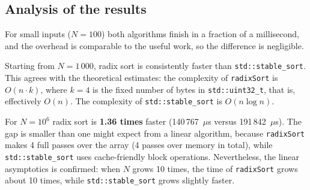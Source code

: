 \subsection{Analysis of the results}

For small inputs ($N = 100$) both algorithms finish in a fraction of a millisecond, and the
overhead is comparable to the useful work, so the difference is negligible.

Starting from $N = 1\,000$, radix sort is consistently faster than \texttt{std::stable\_sort}.
This agrees with the theoretical estimates: the complexity of \texttt{radixSort} is $O(n \cdot k)$,
where $k = 4$ is the fixed number of bytes in \texttt{std::uint32\_t}, that is, effectively $O(n)$.
The complexity of \texttt{std::stable\_sort} is $O(n \log n)$.

For $N = 10^6$ radix sort is \textbf{1.36 times} faster (140\,767~$\mu$s
versus 191\,842~$\mu$s). The gap is smaller than one might expect from a linear algorithm,
because \texttt{radixSort} makes 4 full passes over the array (4 passes over memory in total),
while \texttt{std::stable\_sort} uses cache-friendly block operations.
Nevertheless, the linear asymptotics is confirmed: when $N$ grows 10 times, the time of
\texttt{radixSort} grows about 10 times, while \texttt{std::stable\_sort} grows slightly faster.

\pagebreak
